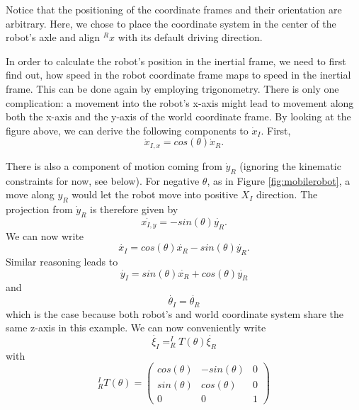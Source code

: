 Notice that the positioning of the coordinate frames and their orientation are arbitrary. Here, we chose to place the coordinate system in the center of the robot's axle and align $^Rx$ with its default driving direction.

In order to calculate the robot's position in the inertial frame, we need to first find out, how speed in the robot coordinate frame maps to speed in the inertial frame. This can be done again by employing trigonometry. There is only one complication: a movement into the robot's x-axis might lead to movement along both the x-axis and the y-axis of the world coordinate frame. By looking at the figure above, we can derive the following components to $\dot{x}_I$. First, 
\begin{equation}
\dot{x}_{I,x}=cos(\theta) \dot{x}_R.
\end{equation}

There is also a component of motion coming from $ \dot{y}_R$ (ignoring the kinematic constraints for now, see below).  For negative $ \theta$, as in Figure \ref{fig:mobilerobot}, a move along $y_R$ would let the robot move into positive $ X_I$ direction. The projection from $ \dot{y}_R$ is therefore given by 
\begin{equation}
\dot{x_{I,y}}=-sin(\theta)\dot{y_R}.
\end{equation} 
We can now write
\begin{equation}
\dot{x_I}=cos(\theta) \dot{x_R} - sin(\theta) \dot{y_R}.
\end{equation}
Similar reasoning leads to
\begin{equation}
\dot{y_I}=sin(\theta) \dot{x_R} + cos(\theta) \dot{y_R}
\end{equation}
and
\begin{equation}
\dot{\theta_I}=\dot{\theta_R}
\end{equation}
which is the case because both robot's and world coordinate system share the same z-axis in this example. We can now conveniently write
\begin{equation}
\dot{\xi_I}=^I_RT(\theta)\dot{\xi_R}
\end{equation}
with
\begin{equation}
^I_RT(\theta)=\left(\begin{array}{ccc}
cos(\theta) & -sin(\theta) & 0 \\
sin(\theta) & cos(\theta) & 0 \\
0 & 0 & 1\end{array}\right)
\end{equation}

